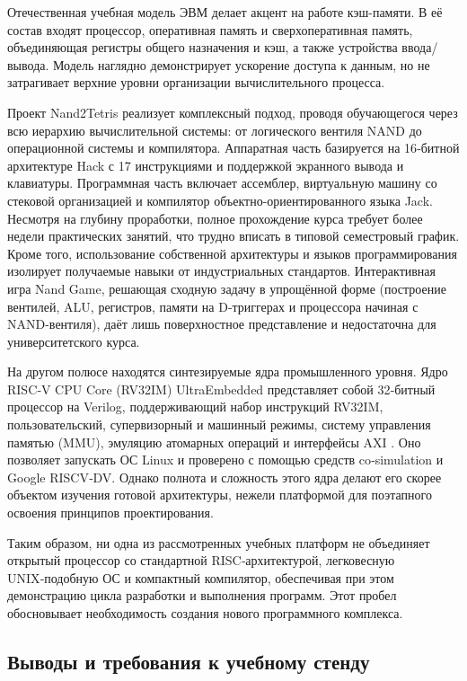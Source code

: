 Отечественная учебная модель ЭВМ \cite{ourcomputer} делает акцент на работе кэш-памяти. В её состав входят процессор, оперативная память и сверхоперативная память, объединяющая регистры общего назначения и кэш, а также устройства ввода/вывода. Модель наглядно демонстрирует ускорение доступа к данным, но не затрагивает верхние уровни организации вычислительного процесса.

Проект Nand2Tetris \cite{Nand2Tetris} реализует комплексный подход, проводя обучающегося через всю иерархию вычислительной системы: от логического вентиля NAND до операционной системы и компилятора. Аппаратная часть базируется на 16‑битной архитектуре Hack с 17 инструкциями и поддержкой экранного вывода и клавиатуры. Программная часть включает ассемблер, виртуальную машину со стековой организацией и компилятор объектно-ориентированного языка Jack. Несмотря на глубину проработки, полное прохождение курса требует более недели практических занятий, что трудно вписать в типовой семестровый график. Кроме того, использование собственной архитектуры и языков программирования изолирует получаемые навыки от индустриальных стандартов. Интерактивная игра Nand Game, решающая сходную задачу в упрощённой форме (построение вентилей, ALU, регистров, памяти на D‑триггерах и процессора начиная с NAND-вентиля), даёт лишь поверхностное представление и недостаточна для университетского курса.

На другом полюсе находятся синтезируемые ядра промышленного уровня. Ядро RISC‑V CPU Core (RV32IM) UltraEmbedded представляет собой 32‑битный процессор на Verilog, поддерживающий набор инструкций RV32IM, пользовательский, супервизорный и машинный режимы, систему управления памятью (MMU), эмуляцию атомарных операций и интерфейсы AXI \cite{UltraEmbedded}. Оно позволяет запускать ОС Linux и проверено с помощью средств co‑simulation и Google RISCV‑DV. Однако полнота и сложность этого ядра делают его скорее объектом изучения готовой архитектуры, нежели платформой для поэтапного освоения принципов проектирования.

Таким образом, ни одна из рассмотренных учебных платформ не объединяет открытый процессор со стандартной RISC‑архитектурой, легковесную UNIX‑подобную ОС и компактный компилятор, обеспечивая при этом демонстрацию цикла разработки и выполнения программ. Этот пробел обосновывает необходимость создания нового программного комплекса.

\subsection{Выводы и требования к учебному стенду}


